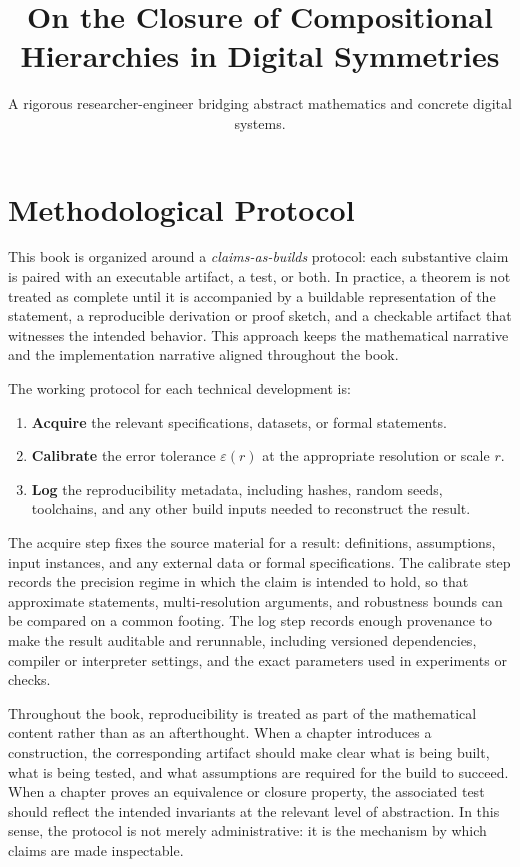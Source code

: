 \documentclass[11pt]{article}
\title{On the Closure of Compositional Hierarchies in Digital Symmetries}
\author{A rigorous researcher-engineer bridging abstract mathematics and concrete digital systems.}
\begin{document}
\section*{Methodological Protocol}

This book is organized around a \emph{claims-as-builds} protocol: each substantive claim is paired with an executable artifact, a test, or both. In practice, a theorem is not treated as complete until it is accompanied by a buildable representation of the statement, a reproducible derivation or proof sketch, and a checkable artifact that witnesses the intended behavior. This approach keeps the mathematical narrative and the implementation narrative aligned throughout the book.

The working protocol for each technical development is:
\begin{enumerate}
  \item \textbf{Acquire} the relevant specifications, datasets, or formal statements.
  \item \textbf{Calibrate} the error tolerance \(\varepsilon(r)\) at the appropriate resolution or scale \(r\).
  \item \textbf{Log} the reproducibility metadata, including hashes, random seeds, toolchains, and any other build inputs needed to reconstruct the result.
\end{enumerate}

The acquire step fixes the source material for a result: definitions, assumptions, input instances, and any external data or formal specifications. The calibrate step records the precision regime in which the claim is intended to hold, so that approximate statements, multi-resolution arguments, and robustness bounds can be compared on a common footing. The log step records enough provenance to make the result auditable and rerunnable, including versioned dependencies, compiler or interpreter settings, and the exact parameters used in experiments or checks.

Throughout the book, reproducibility is treated as part of the mathematical content rather than as an afterthought. When a chapter introduces a construction, the corresponding artifact should make clear what is being built, what is being tested, and what assumptions are required for the build to succeed. When a chapter proves an equivalence or closure property, the associated test should reflect the intended invariants at the relevant level of abstraction. In this sense, the protocol is not merely administrative: it is the mechanism by which claims are made inspectable.
\end{document}

